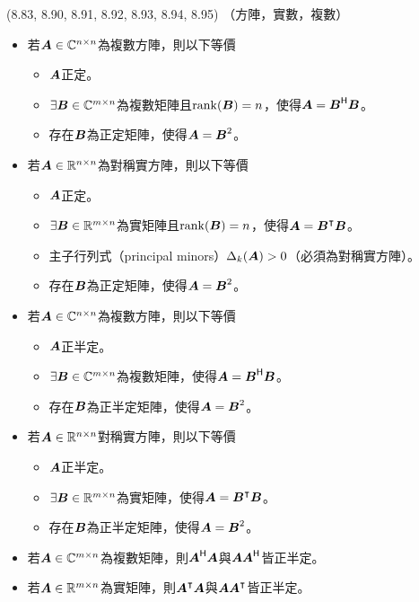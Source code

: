 \item \begin{theorem}{(8.83, 8.90, 8.91, 8.92, 8.93, 8.94, 8.95)} （方陣，實數，複數）
	\begin{itemize}
		\item 若$\boldsymbol{A} \in \mathbb{C}^{n \times n}$為複數方陣，則以下等價
			\begin{itemize}
				\item $\boldsymbol{A}$正定。
				\item $\exists \boldsymbol{B} \in \mathbb{C}^{m \times n}$為複數矩陣且\textbf{$\operatorname{rank}(\boldsymbol{B}) = n$}，使得$\boldsymbol{A} = \boldsymbol{B}^{\mathsf{H}}\boldsymbol{B}$。
				\item 存在$\boldsymbol{B}$為正定矩陣，使得$\boldsymbol{A} = \boldsymbol{B}^2$。
			\end{itemize}
		\item 若$\boldsymbol{A} \in \mathbb{R}^{n \times n}$為對稱實方陣，則以下等價
			\begin{itemize}
				\item $\boldsymbol{A}$正定。
				\item $\exists \boldsymbol{B} \in \mathbb{R}^{m \times n}$為實矩陣且\textbf{$\operatorname{rank}(\boldsymbol{B}) = n$}，使得$\boldsymbol{A} = \boldsymbol{B}^\intercal\boldsymbol{B}$。
				\item 主子行列式（principal minors）$\Delta_k(\boldsymbol{A}) > 0$（必須為對稱實方陣）。
				\item 存在$\boldsymbol{B}$為正定矩陣，使得$\boldsymbol{A} = \boldsymbol{B}^2$。
			\end{itemize}
		\item 若$\boldsymbol{A} \in \mathbb{C}^{n \times n}$為複數方陣，則以下等價
			\begin{itemize}
				\item $\boldsymbol{A}$正半定。
				\item $\exists \boldsymbol{B} \in \mathbb{C}^{m \times n}$為複數矩陣，使得$\boldsymbol{A} = \boldsymbol{B}^{\mathsf{H}}\boldsymbol{B}$。
				\item 存在$\boldsymbol{B}$為正半定矩陣，使得$\boldsymbol{A} = \boldsymbol{B}^2$。
			\end{itemize}
		\item 若$\boldsymbol{A} \in \mathbb{R}^{n \times n}$對稱實方陣，則以下等價
			\begin{itemize}
				\item $\boldsymbol{A}$正半定。
				\item $\exists \boldsymbol{B} \in \mathbb{R}^{m \times n}$為實矩陣，使得$\boldsymbol{A} = \boldsymbol{B}^\intercal\boldsymbol{B}$。
				\item 存在$\boldsymbol{B}$為正半定矩陣，使得$\boldsymbol{A} = \boldsymbol{B}^2$。
			\end{itemize}
		\item 若$\boldsymbol{A} \in \mathbb{C}^{m \times n}$為複數矩陣，則$\boldsymbol{A}^{\mathsf{H}}\boldsymbol{A}$與$\boldsymbol{A}\boldsymbol{A}^{\mathsf{H}}$皆正半定。
		\item 若$\boldsymbol{A} \in \mathbb{R}^{m \times n}$為實矩陣，則$\boldsymbol{A}^\intercal\boldsymbol{A}$與$\boldsymbol{A}\boldsymbol{A}^\intercal$皆正半定。
	\end{itemize}
\end{theorem}

